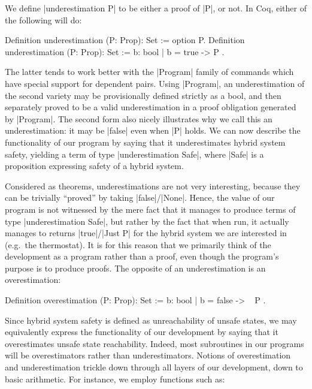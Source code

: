 \documentclass[runningheads]{llncs}
\begin{document}
We define |underestimation P| to be either a proof of
|P|, or not. In Coq, either of the following will do:
\begin{code}
Definition underestimation (P: Prop): Set := option P.
Definition underestimation (P: Prop): Set := { b: bool | b = true -> P }.
\end{code}
The latter tends to work better with the |Program| family of commands
\cite{sozeau} which have special support for dependent pairs. Using
|Program|, an underestimation of the second variety may be
provisionally defined strictly as a bool, and then separately proved
to be a valid underestimation in a proof obligation generated by
|Program|. The second form also nicely illustrates why we call this an
underestimation: it may be |false| even when |P| holds. We can now
describe the functionality of our program by saying that it
underestimates hybrid system safety, yielding a term of type
|underestimation Safe|, where |Safe| is a proposition expressing
safety of a hybrid system.

Considered as theorems, underestimations are not very interesting,
because they can be trivially ``proved'' by taking
|false|/|None|. Hence, the value of our program is not witnessed by
the mere fact that it manages to produce terms of type
|underestimation Safe|, but rather by the fact that when run, it
actually manages to returns |true|/|Just P| for the hybrid system we
are interested in (e.g.\ the thermostat). It is for this reason that
we primarily think of the development as a program rather than a
proof, even though the program's purpose is to produce proofs.
The opposite of an underestimation is an overestimation:
\begin{code}
Definition overestimation (P: Prop): Set := { b: bool | b = false -> ~ P }.
\end{code}

Since hybrid system safety is defined as unreachability of unsafe
states, we may equivalently express the functionality of our
development by saying that it overestimates unsafe state
reachability. Indeed, most subroutines in our programs will be
overestimators rather than underestimators. Notions of overestimation
and underestimation trickle down through all layers of our
development, down to basic arithmetic. For instance, we employ
functions such as:

\end{document}
